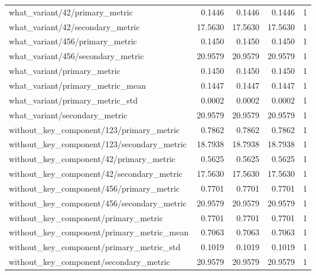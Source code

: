 \begin{table}[h]
\begin{tabular}{lrrrr}
what_variant/42/primary_metric & 0.1446 & 0.1446 & 0.1446 & 1 \\
what_variant/42/secondary_metric & 17.5630 & 17.5630 & 17.5630 & 1 \\
what_variant/456/primary_metric & 0.1450 & 0.1450 & 0.1450 & 1 \\
what_variant/456/secondary_metric & 20.9579 & 20.9579 & 20.9579 & 1 \\
what_variant/primary_metric & 0.1450 & 0.1450 & 0.1450 & 1 \\
what_variant/primary_metric_mean & 0.1447 & 0.1447 & 0.1447 & 1 \\
what_variant/primary_metric_std & 0.0002 & 0.0002 & 0.0002 & 1 \\
what_variant/secondary_metric & 20.9579 & 20.9579 & 20.9579 & 1 \\
without_key_component/123/primary_metric & 0.7862 & 0.7862 & 0.7862 & 1 \\
without_key_component/123/secondary_metric & 18.7938 & 18.7938 & 18.7938 & 1 \\
without_key_component/42/primary_metric & 0.5625 & 0.5625 & 0.5625 & 1 \\
without_key_component/42/secondary_metric & 17.5630 & 17.5630 & 17.5630 & 1 \\
without_key_component/456/primary_metric & 0.7701 & 0.7701 & 0.7701 & 1 \\
without_key_component/456/secondary_metric & 20.9579 & 20.9579 & 20.9579 & 1 \\
without_key_component/primary_metric & 0.7701 & 0.7701 & 0.7701 & 1 \\
without_key_component/primary_metric_mean & 0.7063 & 0.7063 & 0.7063 & 1 \\
without_key_component/primary_metric_std & 0.1019 & 0.1019 & 0.1019 & 1 \\
without_key_component/secondary_metric & 20.9579 & 20.9579 & 20.9579 & 1 \\
\hline
\end{tabular}
\end{table}